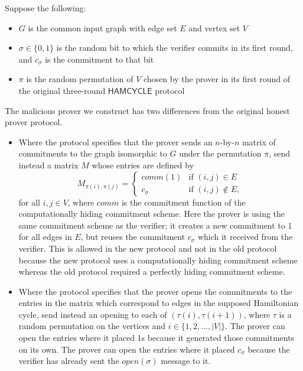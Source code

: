 \documentclass{article}
\newcommand{\lang}[1]{{\ensuremath{\mathsf{#1}}}}
\begin{document}
\begin{enumerate}
  Suppose the following:
  \begin{itemize}
  \item $G$ is the common input graph with edge set $E$ and vertex set $V$
  \item $\sigma\in\{0,1\}$ is the random bit to which the verifier commits in its first round, and $c_\sigma$ is the commitment to that bit
  \item $\pi$ is the random permutation of $V$ chosen by the prover in its first round of the original three-round \lang{HAMCYCLE} protocol
  \end{itemize}
  The malicious prover we construct has two differences from the original honest prover protocol.
  \begin{itemize}
  \item Where the protocol specifies that the prover sends an $n$-by-$n$ matrix of commitments to the graph isomorphic to $G$ under the permutation $\pi$, send instead a matrix $M$ whose entries are defined by
    \begin{displaymath}
      M_{\pi(i),\pi(j)} =
      \begin{cases}
        comm(1) & \text{if } (i, j)\in E \\
        c_\sigma & \text{if } (i, j)\notin E,
      \end{cases}
    \end{displaymath}
    for all $i, j\in V$, where $comm$ is the commitment function of the computationally hiding commitment scheme.
    Here the prover is using the same commitment scheme as the verifier; it creates a new commitment to 1 for all edges in $E$, but reuses the commitment $c_\sigma$ which it received from the verifier.
    This is allowed in the new protocol and not in the old protocol because the new protocol uses a computationally hiding commitment scheme whereas the old protocol required a perfectly hiding commitment scheme.
  \item
    Where the protocol specifies that the prover opens the commitments to the entries in the matrix which correspond to edges in the supposed Hamiltonian cycle, send instead an opening to each of $(\tau(i),\tau(i+1))$, where $\tau$ is a random permutation on the vertices and $i\in\{1, 2, \ldots, |V|\}$.
    The prover can open the entries where it placed 1s because it generated those commitments on its own.
    The prover can open the entries where it placed $c_\sigma$ because the verifier has already sent the $open(\sigma)$ message to it.
  \end{itemize}


\end{enumerate}
\end{document}
